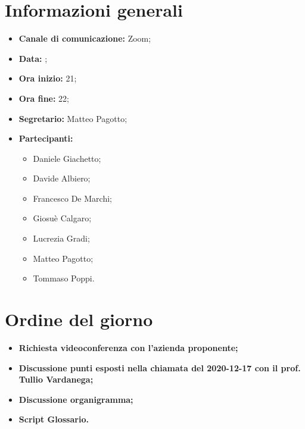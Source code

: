 \section{Informazioni generali}

\begin{itemize}

	\item \textbf{Canale di comunicazione:} Zoom;
	
	\item \textbf{Data:} \DataMeeting{};
	
	\item \textbf{Ora inizio:} 21;
	
	\item \textbf{Ora fine:} 22;
	
	\item \textbf{Segretario:} Matteo Pagotto;
	
	\item \textbf{Partecipanti:}
	
		\begin{itemize}
		
			\item Daniele Giachetto;
			\item Davide Albiero;
			\item Francesco De Marchi;
			\item Giosuè Calgaro;
			\item Lucrezia Gradi;
			\item Matteo Pagotto;
			\item Tommaso Poppi.
				 
		\end{itemize}

\end{itemize}

\section{Ordine del giorno}

\begin{itemize}

	\item\textbf{Richiesta videoconferenza con l'azienda proponente;}
	
	\item\textbf{Discussione punti esposti nella chiamata del 2020-12-17 con il prof. Tullio Vardanega;}

	\item\textbf{Discussione organigramma;}

	\item\textbf{Script Glossario.}

\end{itemize}

